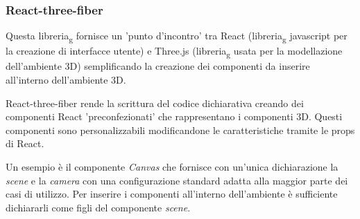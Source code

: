 \subsubsection{React-three-fiber}
Questa libreria\textsubscript{g} fornisce un 'punto d'incontro' tra React (libreria\textsubscript{g} javascript per la creazione di interfacce utente) e Three.js (libreria\textsubscript{g} usata per
la modellazione dell'ambiente 3D) semplificando la creazione dei componenti da inserire all'interno dell'ambiente 3D.

React-three-fiber rende la scrittura del codice dichiarativa creando dei componenti React 'preconfezionati' che rappresentano i componenti 3D.
Questi componenti sono personalizzabili modificandone le caratteristiche tramite le props di React.

Un esempio è il componente \textit{Canvas} che fornisce con un'unica dichiarazione la \textit{scene} e la \textit{camera} con una configurazione standard 
adatta alla maggior parte dei casi di utilizzo. Per inserire i componenti all'interno dell'ambiente è sufficiente dichiararli come figli del 
componente \textit{scene}.
